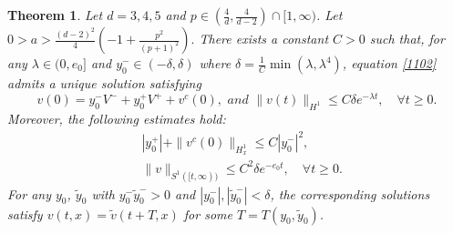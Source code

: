 \documentclass[12pt]{amsart}
\newcommand{\R}{\mathbb R}
\newtheorem{theorem}{Theorem}[section]
\begin{document}
\begin{theorem}\label{exiuni} 
Let $d=3,4,5$ and $p\in (\tfrac 4d, \tfrac 4{d-2})\cap [1,\infty)$. Let $0>a>\tfrac{(d-2)^2}4(-1+\frac{p^2}{(p+1)^2}).$ There exists a constant $C>0$ such that, for any $\lambda\in(0, e_0]$ and $y_0^- \in (-\delta, \delta)$ where 
$\delta=\frac 1{C} \min(\lambda,\lambda^4)$, equation \eqref{1102} admits a unique solution satisfying  
\begin{equation} \label{E:class}
v(0)=y_0^-V^-+y_0^+V^++v^c(0), \textit{ and } \|v(t) \|_{H^1}
\le C \delta e^{-\lambda t},  \quad \forall t\ge 0.
\end{equation}
Moreover, the following estimates hold:
\begin{align}\label{438}
& |y_0^+|+\|v^c(0)\|_{H^1_x}\le C |y_0^-|^2, \\
& \|v\|_{ S^1([t,\infty))}\le C^2 \delta e^{-e_0 t}, \quad \forall t\ge 0. 
\end{align}
For any $y_0$, $\tilde y_0$ with $y_0^-\tilde y_0^->0$ and $|y_0^-|, |\tilde y_0^-|< \delta$, the corresponding solutions satisfy $v(t,x)=\tilde v(t+T,x)$ for some $T=T(y_0, \tilde y_0)$. 
\end{theorem}
\end{document}
